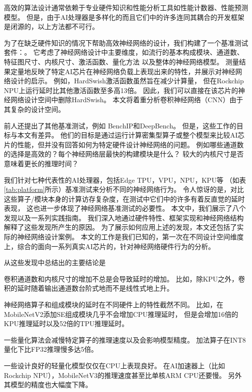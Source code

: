 高效的算法设计通常依赖于专业硬件知识和性能分析工具如性能计数器、性能预测模型。
但是，由于AI处理器是多样化的而且它们中的许多连同其耦合的开发框架是闭源的，以上方法都不可行。

为了在缺乏硬件知识的情况下帮助高效神经网络的设计，我们构建了一个基准测试套件：\sysname。
它考虑了神经网络设计中主要维度，如流行的基本构成模块、通道数、特征图尺寸、内核尺寸、激活函数、量化方法
以及整体的神经网络模型。
测量结果定量地反映了特定AI芯片在神经网络负载上表现出来的特性，并展示对神经网络设计的启示。
例如，HardSwish\cite{howard2019searching}激活函数虽然旨在减少计算量，
但在Rockchip NPU\cite{rk3399pro}上运行延时比其他激活函数至多高13倍。
因此，我们可以直接在该芯片的神经网络设计空间中删除HardSwish。
本文将着重分析卷积神经网络（CNN）由于其复杂的设计空间。

前人还提出了其他基准测试，例如
BenchIP\cite{tao2017benchip}和DeepBench\cite{deepbench}。
但是，这些工作的目标与本文有差异。
他们的目标是通过运行计算密集型算子或整个模型来比较AI芯片的性能，但并没有回答如何为特定硬件设计神经网络的问题。
例如哪些通道数的选择是高效的？每个神经网络层最快的构建模块是什么？
较大的内核尺寸是否意味着更长的推理时间？

我们针对七种代表性的AI处理器，包括Edge TPU，VPU，NPU，KPU等
（如表\ref{tab:platform}所示）基准测试来分析不同的神经网络行为。
令人惊讶的是，对比这些算子/模块本身的计算访存复杂度，在测试中它们中的许多有着反直觉的延时表现，
这也进一步体现了神经网络基准测试的必要性。
本文中，我们展示了八个发现以及一系列实践指南。
我们深入地通过硬件特性、框架实现和神经网络结构解释了这些发现所产生的原因。
为了展示如何应用上述的发现，本文还包括了实际的神经网络设计案例。
本文的工作是我们已知的，第一次在不同设计空间维度上，综合的面向一系列真实AI芯片的，针对神经网络硬件行为的分析。

从这些发现中总结出的主要结论是
\begin{enumerate*}
    \item 卷积通道数和内核尺寸的增加不总是会导致延时的增加。
    比如，除KPU之外，卷积的延时随着输出通道数台阶式地而不是线性式地上升。
    \item 神经网络算子和组成模块的延时在不同硬件上的特性截然不同。
    比如，在MobileNetV2添加SE\cite{hu2018squeeze}组成模块几乎不会增加CPU推理延时，
    但是会增加16倍的KPU推理延时以及52倍的TPU推理延时。
    \item 一些量化算法会减慢特定算子的推理速度以及会影响模型精度。
    加法算子在INT8量化下比FP32推理慢多达5倍。
    \item 一些设计良好的轻量化模型仅仅在CPU上表现良好。
    在AI加速器上（比如Rockchip NPU），MobileNetV3的推理速度甚至比单核ARM CPU还要慢。
    另外其模型的精度也大幅度下降。
\end{enumerate*}

